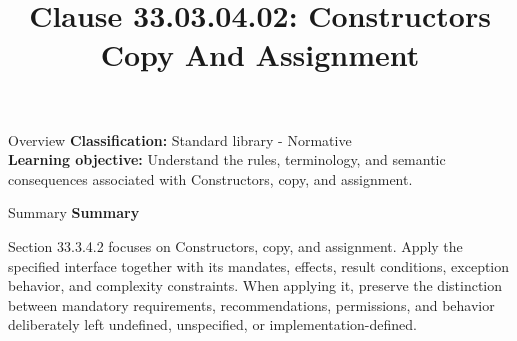 \documentclass[10pt,letterpaper]{article}
\title{Clause 33.03.04.02: Constructors Copy And Assignment}
\author{}
\date{}
\begin{document}
\maketitle
\begin{CornellOverviewBox}{Overview}
\textbf{Classification:} Standard library - Normative\\[2pt]
\textbf{Learning objective:} Understand the rules, terminology, and semantic consequences associated with Constructors, copy, and assignment.
\end{CornellOverviewBox}\begin{CornellSummaryBox}{Summary}
{\sffamily\bfseries\color{Accent} Summary}\par\vspace{3pt}Section 33.3.4.2 focuses on Constructors, copy, and assignment. Apply the specified interface together with its mandates, effects, result conditions, exception behavior, and complexity constraints. When applying it, preserve the distinction between mandatory requirements, recommendations, permissions, and behavior deliberately left undefined, unspecified, or implementation-defined.
\end{CornellSummaryBox}
\end{document}
